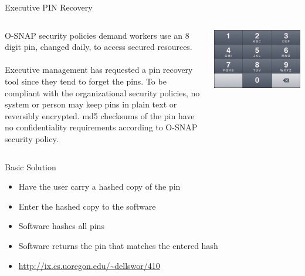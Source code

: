 \documentclass[xcolor=dvipsnames]{beamer}
\begin{document}
	\begin{frame}{Executive PIN Recovery}
		\begin{columns}
			\begin{column}{0.5\textwidth}
					O-SNAP security policies demand workers use an 8 digit pin, changed daily, to 
					access secured resources. \\~\\
					Executive management has requested a pin recovery tool since they tend to forget 
					the pins. To be compliant with the organizational security policies, no system or 
					person may keep pins in plain text or reversibly encrypted. md5 checksums of the 
					pin have no confidentiality requirements according to O-SNAP security policy.
			\end{column}
			\begin{column}{0.5\textwidth}
				\includegraphics[width=\textwidth]{images/keypad}
			\end{column}
		\end{columns}
	\end{frame}
	
	\begin{frame}{Basic Solution}
		\begin{itemize}
			\item Have the user carry a hashed copy of the pin
			\item Enter the hashed copy to the software
			\item Software hashes all pins
			\item Software returns the pin that matches the entered hash
			\item \href{http://ix.cs.uoregon.edu/~dellswor/410}{\url{http://ix.cs.uoregon.edu/~dellswor/410}}
		\end{itemize}
	\end{frame}
	
\end{document}
